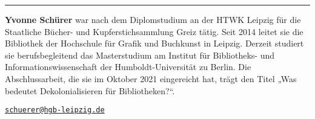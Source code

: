 \begin{center}\rule{0.5\linewidth}{0.5pt}\end{center}

\textbf{Yvonne Schürer} war nach dem Diplomstudium an der HTWK Leipzig
für die Staatliche Bücher- und Kupferstichsammlung Greiz tätig. Seit
2014 leitet sie die Bibliothek der Hochschule für Grafik und Buchkunst
in Leipzig. Derzeit studiert sie berufsbegleitend das Masterstudium am
Institut für Bibliotheks- und Informationswissenschaft der
Humboldt-Universität zu Berlin. Die Abschlussarbeit, die sie im Oktober
2021 eingereicht hat, trägt den Titel „Was bedeutet Dekolonialisieren
für Bibliotheken?{}``.

\href{mailto:schuerer@hgb-leipzig.de}{\nolinkurl{schuerer@hgb-leipzig.de}}
